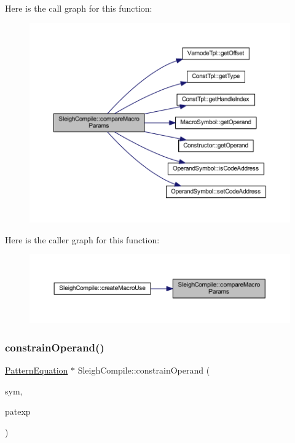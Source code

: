 Here is the call graph for this function\+:
\nopagebreak
\begin{figure}[H]
\begin{center}
\leavevmode
\includegraphics[width=350pt]{class_sleigh_compile_adce2cad9a79bab4e9d03357e96668774_cgraph}
\end{center}
\end{figure}
Here is the caller graph for this function\+:
\nopagebreak
\begin{figure}[H]
\begin{center}
\leavevmode
\includegraphics[width=350pt]{class_sleigh_compile_adce2cad9a79bab4e9d03357e96668774_icgraph}
\end{center}
\end{figure}
\mbox{\label{class_sleigh_compile_af726f70a39e1b7e9a7695f7fcae7523e}} 
\subsubsection{\texorpdfstring{constrainOperand()}{constrainOperand()}}
{\footnotesize\ttfamily \mbox{\hyperlink{class_pattern_equation}{Pattern\+Equation}} $\ast$ Sleigh\+Compile\+::constrain\+Operand (\begin{DoxyParamCaption}\item[{\mbox{\hyperlink{class_operand_symbol}{Operand\+Symbol}} $\ast$}]{sym,  }\item[{\mbox{\hyperlink{class_pattern_expression}{Pattern\+Expression}} $\ast$}]{patexp }\end{DoxyParamCaption})}



